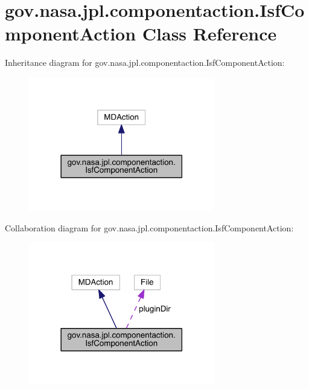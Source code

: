 \section{gov.\+nasa.\+jpl.\+componentaction.\+Isf\+Component\+Action Class Reference}
\label{classgov_1_1nasa_1_1jpl_1_1componentaction_1_1_isf_component_action}


Inheritance diagram for gov.\+nasa.\+jpl.\+componentaction.\+Isf\+Component\+Action\+:
\nopagebreak
\begin{figure}[H]
\begin{center}
\leavevmode
\includegraphics[width=230pt]{classgov_1_1nasa_1_1jpl_1_1componentaction_1_1_isf_component_action__inherit__graph}
\end{center}
\end{figure}


Collaboration diagram for gov.\+nasa.\+jpl.\+componentaction.\+Isf\+Component\+Action\+:
\nopagebreak
\begin{figure}[H]
\begin{center}
\leavevmode
\includegraphics[width=230pt]{classgov_1_1nasa_1_1jpl_1_1componentaction_1_1_isf_component_action__coll__graph}
\end{center}
\end{figure}
